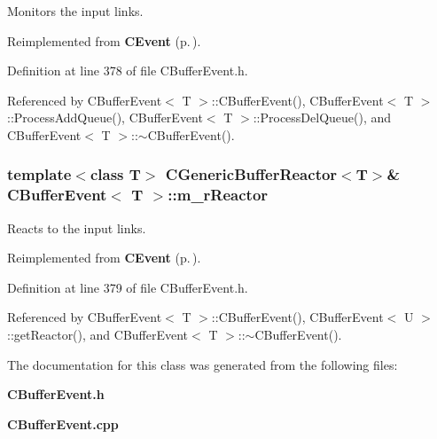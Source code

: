 Monitors the input links.



Reimplemented from {\bf CEvent} {\rm (p.\,\pageref{classCEvent_o4})}.

Definition at line 378 of file CBuffer\-Event.h.

Referenced by CBuffer\-Event$<$ T $>$::CBuffer\-Event(), CBuffer\-Event$<$ T $>$::Process\-Add\-Queue(), CBuffer\-Event$<$ T $>$::Process\-Del\-Queue(), and CBuffer\-Event$<$ T $>$::$\sim$CBuffer\-Event().
\subsubsection{\setlength{\rightskip}{0pt plus 5cm}template$<$class T$>$ {\bf CGeneric\-Buffer\-Reactor}$<$T$>$\& CBuffer\-Event$<$ T $>$::m\_\-r\-Reactor\hspace{0.3cm}{\tt  [private]}}\label{classCBufferEvent_o3}


Reacts to the input links.



Reimplemented from {\bf CEvent} {\rm (p.\,\pageref{classCEvent_o5})}.

Definition at line 379 of file CBuffer\-Event.h.

Referenced by CBuffer\-Event$<$ T $>$::CBuffer\-Event(), CBuffer\-Event$<$ U $>$::get\-Reactor(), and CBuffer\-Event$<$ T $>$::$\sim$CBuffer\-Event().

The documentation for this class was generated from the following files:\begin{CompactItemize}
\item 
{\bf CBuffer\-Event.h}\item 
{\bf CBuffer\-Event.cpp}\end{CompactItemize}
